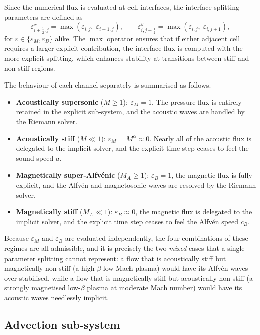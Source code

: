 \documentclass[a4paper,fleqn]{cas-sc}
\theoremstyle{remark}
\newcommand{\eps}{\varepsilon}
\newcommand{\epsM}{\eps_{M}}
\newcommand{\epsB}{\eps_{B}}
\begin{document}
Since the numerical flux is evaluated at cell interfaces, the interface splitting
parameters are defined as
\begin{equation}
\label{eq:eps_face}
\eps^{x}_{i+\frac12,j}=\max\!\left(\eps_{i,j},\;\eps_{i+1,j}\right),
\qquad
\eps^{y}_{i,j+\frac12}=\max\!\left(\eps_{i,j},\;\eps_{i,j+1}\right),
\end{equation}
for $\eps\in\{\epsM,\epsB\}$ alike. The $\max$ operator ensures that if either
adjacent cell requires a larger explicit contribution, the interface flux is
computed with the more explicit splitting, which enhances stability at transitions
between stiff and non-stiff regions.

The behaviour of each channel separately is summarised as follows.
\begin{itemize}
\item \textbf{Acoustically supersonic} ($M\ge1$): $\epsM=1$. The pressure flux is
entirely retained in the explicit sub-system, and the acoustic waves are handled
by the Riemann solver.
\item \textbf{Acoustically stiff} ($M\ll1$): $\epsM=M^{\alpha}\approx0$. Nearly
all of the acoustic flux is delegated to the implicit solver, and the explicit
time step ceases to feel the sound speed $a$.
\item \textbf{Magnetically super-Alfv\'enic} ($M_A\ge1$): $\epsB=1$, the magnetic
flux is fully explicit, and the Alfv\'en and magnetosonic waves are resolved by
the Riemann solver.
\item \textbf{Magnetically stiff} ($M_A\ll1$): $\epsB\approx0$, the magnetic
flux is delegated to the implicit solver, and the explicit time step ceases to feel the Alfv\'en speed $c_B$.
\end{itemize}

Because $\epsM$ and $\epsB$ are evaluated independently, the four combinations of
these regimes are all admissible, and it is precisely the two \emph{mixed} cases
that a single-parameter splitting cannot represent: a flow that is acoustically
stiff but magnetically non-stiff (a high-$\beta$ low-Mach plasma) would have its
Alfv\'en waves over-stabilised, while a flow that is magnetically stiff but
acoustically non-stiff (a strongly magnetised low-$\beta$ plasma at moderate Mach
number) would have its acoustic waves needlessly implicit.


\subsection{Advection sub-system}
\label{sec:hllem}
\end{document}
